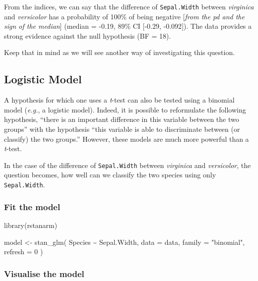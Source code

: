 \documentclass[10pt,a4paper,onecolumn]{article}
\newenvironment{Shaded}{\begin{snugshade}}{\end{snugshade}}
\newcommand{\AttributeTok}[1]{\textcolor[rgb]{0.77,0.63,0.00}{#1}}
\newcommand{\DecValTok}[1]{\textcolor[rgb]{0.00,0.00,0.81}{#1}}
\newcommand{\FunctionTok}[1]{\textcolor[rgb]{0.00,0.00,0.00}{#1}}
\newcommand{\NormalTok}[1]{#1}
\newcommand{\OtherTok}[1]{\textcolor[rgb]{0.56,0.35,0.01}{#1}}
\newcommand{\SpecialCharTok}[1]{\textcolor[rgb]{0.00,0.00,0.00}{#1}}
\newcommand{\StringTok}[1]{\textcolor[rgb]{0.31,0.60,0.02}{#1}}
\begin{document}
From the indices, we can say that the difference of \texttt{Sepal.Width}
between \emph{virginica} and \emph{versicolor} has a probability of
100\% of being negative {[}\emph{from the pd and the sign of the
median}{]} (median = -0.19, 89\% CI {[}-0.29, -0.092{]}). The data
provides a strong evidence against the null hypothesis (BF = 18).

Keep that in mind as we will see another way of investigating this
question.

\hypertarget{logistic-model}{%
\subsection{Logistic Model}\label{logistic-model}}

A hypothesis for which one uses a \emph{t}-test can also be tested using
a binomial model (\emph{e.g.}, a logistic model). Indeed, it is possible
to reformulate the following hypothesis, ``there is an important
difference in this variable between the two groups'' with the hypothesis
``this variable is able to discriminate between (or classify) the two
groups.'' However, these models are much more powerful than a
\emph{t}-test.

In the case of the difference of \texttt{Sepal.Width} between
\emph{virginica} and \emph{versicolor}, the question becomes, how well
can we classify the two species using only \texttt{Sepal.Width}.

\hypertarget{fit-the-model}{%
\subsubsection{Fit the model}\label{fit-the-model}}

\begin{Shaded}
\begin{Highlighting}[]
\FunctionTok{library}\NormalTok{(rstanarm)}

\NormalTok{model }\OtherTok{\textless{}{-}} \FunctionTok{stan\_glm}\NormalTok{(}
\NormalTok{    Species }\SpecialCharTok{\textasciitilde{}}\NormalTok{ Sepal.Width,}
    \AttributeTok{data =}\NormalTok{ data,}
    \AttributeTok{family =} \StringTok{"binomial"}\NormalTok{,}
    \AttributeTok{refresh =} \DecValTok{0}
\NormalTok{  )}
\end{Highlighting}
\end{Shaded}

\hypertarget{visualise-the-model}{%
\subsubsection{Visualise the model}\label{visualise-the-model}}
\end{document}
